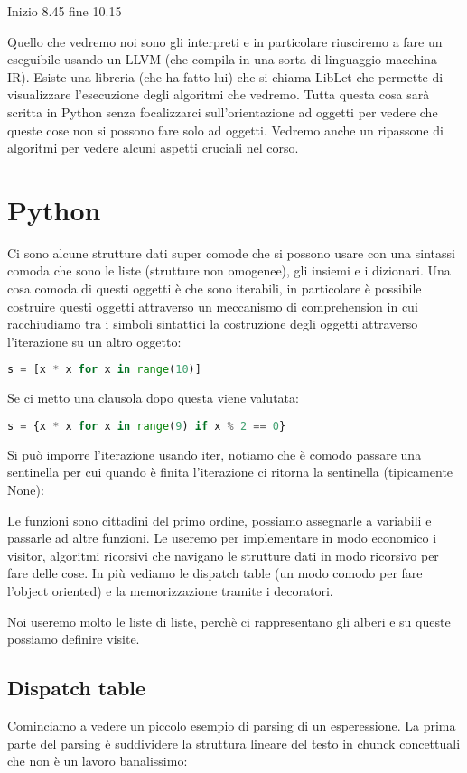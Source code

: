 Inizio 8.45 fine 10.15

Quello che vedremo noi sono gli interpreti e in particolare riusciremo a fare un eseguibile usando un LLVM (che compila in una sorta di linguaggio macchina IR).
Esiste una libreria (che ha fatto lui) che si chiama LibLet che permette di visualizzare l'esecuzione degli algoritmi che vedremo. Tutta questa cosa sarà scritta in Python senza focalizzarci sull'orientazione ad oggetti per vedere che queste cose non si possono fare solo ad oggetti.
Vedremo anche un ripassone di algoritmi per vedere alcuni aspetti cruciali nel corso.

\section{Python}
Ci sono alcune strutture dati super comode che si possono usare con una sintassi comoda che sono le liste (strutture non omogenee), gli insiemi e i dizionari. Una cosa comoda di questi oggetti è che sono iterabili, in particolare è possibile costruire questi oggetti attraverso un meccanismo di comprehension in cui racchiudiamo tra i simboli sintattici la costruzione degli oggetti attraverso l'iterazione su un altro oggetto:

\begin{lstlisting}[language=Python]
s = [x * x for x in range(10)]
\end{lstlisting}

Se ci metto una clausola dopo questa viene valutata:
\begin{lstlisting}[language=Python]
s = {x * x for x in range(9) if x % 2 == 0}
\end{lstlisting}

Si può imporre l'iterazione usando iter, notiamo che è comodo passare una sentinella per cui quando è finita l'iterazione ci ritorna la sentinella (tipicamente None):


Le funzioni sono cittadini del primo ordine, possiamo assegnarle a variabili e passarle ad altre funzioni.
Le useremo per implementare in modo economico i visitor, algoritmi ricorsivi che navigano le strutture dati in modo ricorsivo per fare delle cose. In più vediamo le dispatch table (un modo comodo per fare l'object oriented) e la memorizzazione tramite i decoratori.

Noi useremo molto le liste di liste, perchè ci rappresentano gli alberi e su queste possiamo definire visite.

\subsection{Dispatch table}
Cominciamo a vedere un piccolo esempio di parsing di un esperessione. La prima parte del parsing è suddividere la struttura lineare del testo in chunck concettuali che non è un lavoro banalissimo:

